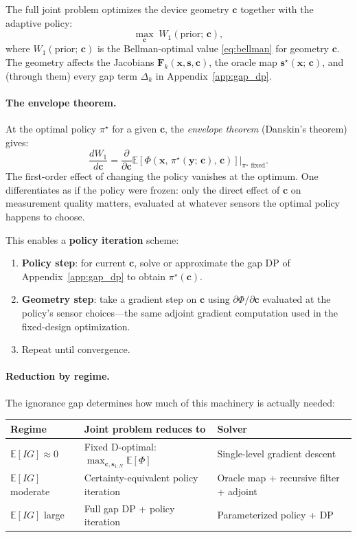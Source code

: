 \documentclass[11pt,a4paper]{article}
\newcommand{\E}{\mathbb{E}}
\begin{document}
The full joint problem optimizes the device geometry $\bm{c}$ together with the adaptive policy:
\begin{equation}
  \max_{\bm{c}} \; W_1(\text{prior};\, \bm{c}),
  \label{eq:joint_bellman}
\end{equation}
where $W_1(\text{prior};\, \bm{c})$ is the Bellman-optimal value \eqref{eq:bellman} for geometry $\bm{c}$.  The geometry affects the Jacobians $\bm{F}_k(\bm{x}, \bm{s}, \bm{c})$, the oracle map $\bm{s}^\star(\bm{x};\, \bm{c})$, and (through them) every gap term $\Delta_k$ in Appendix~\ref{app:gap_dp}.

\paragraph{The envelope theorem.}
At the optimal policy $\pi^\star$ for a given $\bm{c}$, the \emph{envelope theorem} (Danskin's theorem) gives:
\begin{equation}
  \frac{dW_1}{d\bm{c}} = \frac{\partial}{\partial \bm{c}} \E\!\left[\Phi\!\left(\bm{x},\, \pi^\star(\bm{y};\, \bm{c}),\, \bm{c}\right)\right]\bigg|_{\pi^\star \text{ fixed}}.
  \label{eq:envelope}
\end{equation}
The first-order effect of changing the policy vanishes at the optimum.  One differentiates as if the policy were frozen: only the direct effect of $\bm{c}$ on measurement quality matters, evaluated at whatever sensors the optimal policy happens to choose.

This enables a \textbf{policy iteration} scheme:
\begin{enumerate}[nosep]
  \item \textbf{Policy step}: for current $\bm{c}$, solve or approximate the gap DP of Appendix~\ref{app:gap_dp} to obtain $\pi^\star(\bm{c})$.
  \item \textbf{Geometry step}: take a gradient step on $\bm{c}$ using $\partial\Phi/\partial\bm{c}$ evaluated at the policy's sensor choices---the same adjoint gradient computation used in the fixed-design optimization.
  \item Repeat until convergence.
\end{enumerate}

\paragraph{Reduction by regime.}
The ignorance gap determines how much of this machinery is actually needed:
\begin{center}
\begin{tabular}{@{}lll@{}}
\toprule
Regime & Joint problem reduces to & Solver \\
\midrule
$\E[IG] \approx 0$ & Fixed D-optimal: $\max_{\bm{c}, \bm{s}_{1:N}} \E[\Phi]$ & Single-level gradient descent \\
$\E[IG]$ moderate & Certainty-equivalent policy iteration & Oracle map + recursive filter + adjoint \\
$\E[IG]$ large & Full gap DP + policy iteration & Parameterized policy + DP \\
\bottomrule
\end{tabular}
\end{center}
\end{document}
